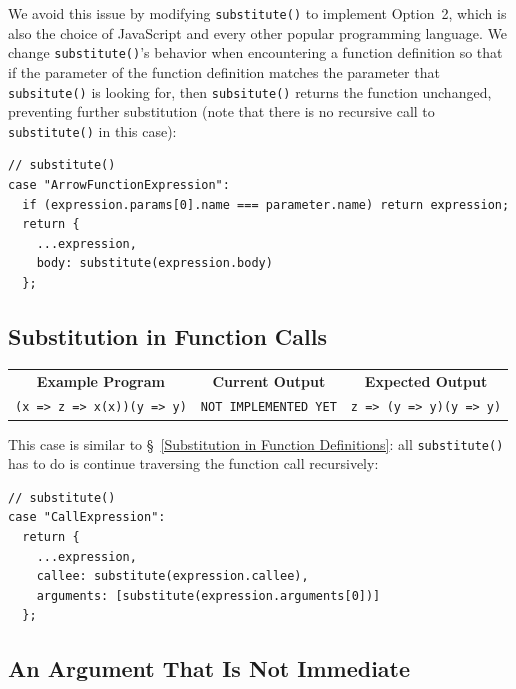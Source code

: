 \documentclass[12pt, oneside]{book}
\begin{document}
We avoid this issue by modifying \texttt{substitute()} to implement Option~2, which is also the choice of JavaScript and every other popular programming language. We change \texttt{substitute()}’s behavior when encountering a function definition so that if the parameter of the function definition matches the parameter that \texttt{subsitute()} is looking for, then \texttt{subsitute()} returns the function unchanged, preventing further substitution (note that there is no recursive call to \texttt{substitute()} in this case):

\begin{verbatim}
// substitute()
case "ArrowFunctionExpression":
  if (expression.params[0].name === parameter.name) return expression;
  return {
    ...expression,
    body: substitute(expression.body)
  };
\end{verbatim}

\subsection{Substitution in Function Calls}
\label{Substitution in Function Calls}

\begin{center}
\begin{tabular}{c|c|c}
\textbf{Example Program} & \textbf{Current Output} & \textbf{Expected Output} \\
\texttt{(x => z => x(x))(y => y)} & \texttt{NOT IMPLEMENTED YET} & \texttt{z => (y => y)(y => y)} \\
\end{tabular}
\end{center}

This case is similar to §~\ref{Substitution in Function Definitions}: all \texttt{substitute()} has to do is continue traversing the function call recursively:

\begin{verbatim}
// substitute()
case "CallExpression":
  return {
    ...expression,
    callee: substitute(expression.callee),
    arguments: [substitute(expression.arguments[0])]
  };
\end{verbatim}

\subsection{An Argument That Is Not Immediate}
\label{An Argument That Is Not Immediate}
\end{document}
